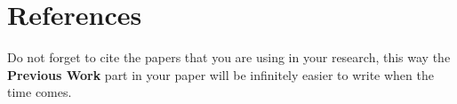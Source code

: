 \documentclass[11pt,letterpaper]{article}
\begin{document}
\begin{multicols}{2}

\end{multicols}

\clearpage

\section{References}
\begin{tip}
Do not forget to cite the papers that you are using in your research, this way the \textbf{Previous Work} part in your paper will be infinitely easier to write when the time comes.
\end{tip}
%

%

\end{document}
